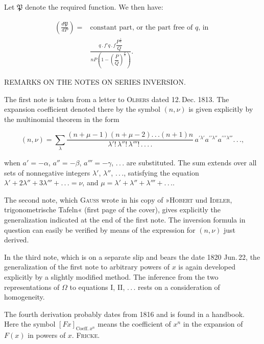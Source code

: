 \noindent\hspace*{\parindent}Let $\mathfrak{P}$ denote the required function. We then have:

\[
\begin{aligned}\left(\frac{d\mathfrak{P}}{dP}\right) ={}& \text{constant part, or the part free of } q \text{, in }\\ &\frac{q\,.\,f'q\,.\,f\dfrac{P^{\frac1n}}{Q}}{nP\left(1-\left(\dfrac{P}{Q}\right)^{\frac{\nu}{n}}\right)}.
\end{aligned}
\]



\begin{center}
REMARKS ON THE NOTES ON SERIES INVERSION.
\end{center}

\noindent\hspace*{\parindent}The first note is taken from a letter to \textsc{Olbers} dated 12.\,Dec. 1813. The expansion coefficient denoted there by the symbol $(n,\nu)$ is given explicitly by the multinomial theorem in the form

\[
(n,\nu) = \sum_\lambda \frac{(n+\mu-1)(n+\mu-2).\,.\,.(n+1)n}{\lambda'!\,\lambda''!\,\lambda'''!\,.\,.\,.\,.}\, a^{\prime\lambda'}a^{\prime\prime\lambda''}a^{\prime\prime\prime\lambda'''}.\,.\,.,
\]

\noindent when $a'=-\alpha$, $a''=-\beta$, $a'''=-\gamma$, .\,.\,. are substituted. The sum extends over all sets of nonnegative integers $\lambda'$, $\lambda''$, .\,.\,., satisfying the equation $\lambda'+2\lambda''+3\lambda'''+.\,.\,.=\nu$, and $\mu=\lambda'+\lambda''+\lambda'''+.\,.\,.$.

The second note, which \textsc{Gauss} wrote in his copy of »\textsc{Hobert} und \textsc{Ideler}, trigonometrische Tafeln« (first page of the cover), gives explicitly the generalization indicated at the end of the first note. The inversion formula in question can easily be verified by means of the expression for $(n,\nu)$ just derived.

In the third note, which is on a separate slip and bears the date 1820 Jun.\,22, the generalization of the first note to arbitrary powers of $x$ is again developed explicitly by a slightly modified method. The inference from the two representations of $\Omega$ to equations I, II, .\,.\,. rests on a consideration of homogeneity.

The fourth derivation probably dates from 1816 and is found in a handbook. Here the symbol $[Fx]_{\text{Coeff.}\,x^n}$ means the coefficient of $x^n$ in the expansion of $F(x)$ in powers of $x$. \hfill\textsc{Fricke.}

